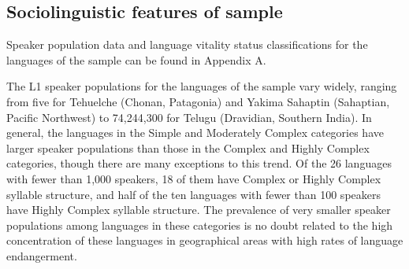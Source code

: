 \subsection{Sociolinguistic features of sample}\label{sec:2.4.3}

  Speaker population data and language vitality status classifications for the languages of the sample can be found in Appendix A.

  The L1 speaker populations for the languages of the sample vary widely, ranging from five for Tehuelche (Chonan, Patagonia) and Yakima Sahaptin (Sahaptian, Pacific Northwest) to 74,244,300 for Telugu (Dravidian, Southern India). In general, the languages in the Simple and Moderately Complex categories have larger speaker populations than those in the Complex and Highly Complex categories, though there are many exceptions to this trend. Of the 26 languages with fewer than 1,000 speakers, 18 of them have Complex or Highly Complex syllable structure, and half of the ten languages with fewer than 100 speakers have Highly Complex syllable structure. The prevalence of very smaller speaker populations among languages in these categories is no doubt related to the high concentration of these languages in geographical areas with high rates of language endangerment.

